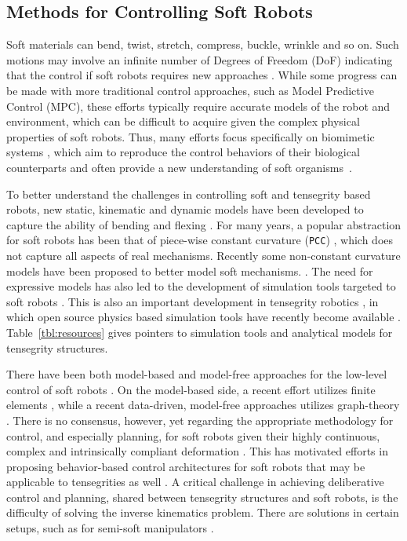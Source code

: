 \subsection{Methods for Controlling Soft Robots}

Soft materials can bend, twist, stretch, compress, buckle, wrinkle and
so on. Such motions may involve an infinite number of Degrees of Freedom (DoF) indicating
that the control if soft robots requires new approaches
\cite{Rus:2015aa, Trimmer:2014aa}. While some progress can 
be made with more traditional control approaches, such as Model
Predictive Control (MPC), these efforts typically require
accurate models of the robot and environment, which can be difficult
to acquire given the complex physical properties of soft robots.
Thus, many efforts focus specifically on biomimetic
systems \cite{Kim:2013aa}, which aim to reproduce the control
behaviors of their biological counterparts and often provide a new
understanding of soft organisms~\cite{Lin:2011aa}.


To better understand the challenges in controlling soft and tensegrity
based robots, new static, kinematic and dynamic models have been
developed to capture the ability of bending and flexing
\cite{Saunders:2011aa, skelton_tensegrity_2009}.  For many
years, a popular abstraction for soft robots has been that of
piece-wise constant curvature ({\tt PCC})
\cite{Webster:2010aa}, which does not
capture all aspects of real mechanisms. Recently some non-constant
curvature models have been proposed to better model soft mechanisms.
\cite{Renda:2014aa}.  The need for
expressive models has also led to the development of simulation tools
targeted to soft robots \cite{Germann:2013aa}. This is also an
important development in tensegrity
robotics \cite{Caluwaerts2013rsif}, in which open source physics based
simulation tools have recently become
available \cite{SunSpiralSoftware}.  Table~\ref{tbl:resources} gives
pointers to simulation tools and analytical models for tensegrity
structures.

There have been both model-based and model-free approaches for the
low-level control of soft robots \cite{Rigatos:2009aa}. On the
model-based side, a recent effort utilizes finite
elements \cite{Largilliere:2015aa}, while a recent data-driven,
model-free approaches utilizes graph-theory \cite{Vikas:2015aa}.
There is no consensus, however, yet regarding the appropriate
methodology for control, and especially planning, for soft robots
given their highly continuous, complex and intrinsically compliant
deformation \cite{Rus:2015aa}.  This has motivated efforts in
proposing behavior-based control architectures for soft robots that
may be applicable to tensegrities as well \cite{Armbrust:2015aa}.  A
critical challenge in achieving deliberative control and planning,
shared between tensegrity structures and soft robots, is the
difficulty of solving the inverse kinematics problem. There are
solutions in certain setups, such as for semi-soft
manipulators \cite{Neppalli:2009aa}.

